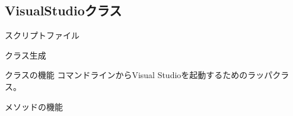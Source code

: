 
\subsection{VisualStudioクラス}
\label{subsec:VisualStudio}

\begin{Description}{スクリプトファイル}
\end{Description}

\medskip
\begin{Description}{クラス生成}
	\begin{Args}
	\end{Args}
\end{Description}

\medskip
\begin{Description}{クラスの機能}
	コマンドラインからVisual Studioを起動するためのラッパクラス。
\end{Description}

\medskip
メソッドの機能


